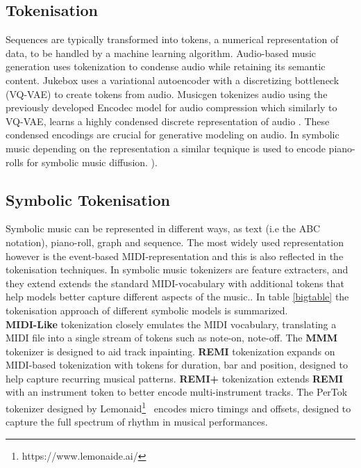 \subsection{Tokenisation}\label{section:tokenization}
Sequences are typically transformed into tokens, a numerical representation of data, to be handled by a machine learning algorithm. Audio-based music generation uses tokenization to condense audio while retaining its semantic content. Jukebox \cite{Dhariwal_Jun_Payne_Kim_Radford_Sutskever_2020} uses a variational autoencoder\cite{Kingma_Welling_2014} with a discretizing bottleneck (VQ-VAE) to create tokens from audio. Musicgen \cite{copet2023simple} tokenizes audio using the previously developed Encodec model for audio compression which similarly to VQ-VAE, learns a highly condensed discrete representation of audio \cite{Défossez_2023_encodec}. These condensed encodings are crucial for generative modeling on audio. In symbolic music depending on the representation a similar teqnique is used to encode piano-rolls for symbolic music diffusion. \cite{Min_Jiang_Xia_Zhao_polyffusion_2023}\cite{Zhu_Liu_Jiang_Zheng_texture_2024}).

\subsection{Symbolic Tokenisation} \label{section:symbolic_tok}
Symbolic music can be represented in different ways, as text (i.e the ABC notation), piano-roll, graph and sequence. The most widely used representation however is the event-based MIDI-representation and this is also reflected in the tokenisation techniques. In symbolic music tokenizers are feature extracters, and they extend  extends the standard MIDI-vocabulary with additional tokens that help models better capture different aspects of the music.\cite{Fradet_Briot_Chhel_2021}. In table \ref{bigtable} the tokenisation approach of different symbolic models is summarized.\\
\textbf{MIDI-Like} tokenization closely emulates the MIDI vocabulary, translating a MIDI file into a single stream of tokens such as note-on, note-off. The \textbf{MMM} tokenizer is designed to aid track inpainting. \textbf{REMI} \cite{Huang_Yang_remi_pop_transformer_2020} tokenization expands on MIDI-based tokenization with tokens for duration, bar and position, designed to help capture recurring musical patterns. \textbf{REMI+} \cite{Rütte_figaro_2023} tokenization extends \textbf{REMI} with an instrument token to better encode multi-instrument tracks. The PerTok tokenizer designed by Lemonaid\footnote{https://www.lemonaide.ai/}  encodes micro timings and offsets, designed to capture the full spectrum of rhythm in musical performances.\\

